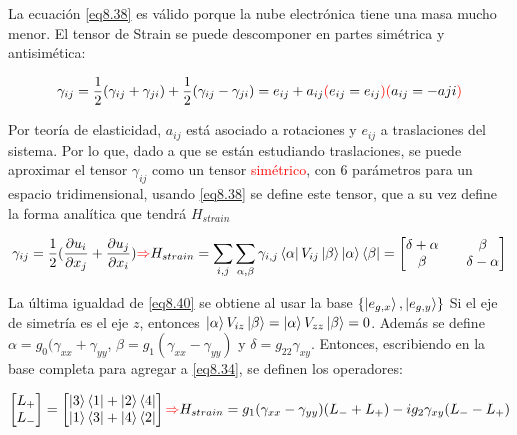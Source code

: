 \documentclass{book}
\begin{document}
La ecuación \ref{eq8.38} es válido porque la nube electrónica tiene una masa mucho menor. El tensor de Strain se puede descomponer en partes simétrica y antisimética:

\begin{equation}\label{eq8.39}\gamma_{ij}=\frac{1}{2}( \gamma_{ij}+\gamma_{ji})+\frac{1}{2}(\gamma_{ij}-\gamma_{ji})=e_{ij}+a_{ij} \textcolor{red}{(}e_{ij}=e_{ij}\textcolor{red}{)}\textcolor{red}{(}a_{ij}=-a{ji}\textcolor{red}{)}\end{equation}

Por teoría de elasticidad, $a_{ij}$ está asociado a rotaciones y $e_{ij}$ a traslaciones del sistema. Por lo que, dado a que se están estudiando traslaciones, se puede aproximar el tensor $\gamma_{ij}$ como un tensor \textcolor{red}{simétrico}, con $6$ parámetros para un espacio tridimensional, usando \ref{eq8.38} se define este tensor, que a su vez define la forma analítica que tendrá $H_{strain}$

\begin{equation}\label{eq8.40}\gamma_{ij}=\frac{1}{2}(\frac{\partial u_i}{\partial x_j}+\frac{\partial u_j}{\partial x_i})\textcolor{red}{\Rightarrow} H_{strain}=\sum_{i,j}\sum_{\alpha,\beta}\gamma_{i,j}\bra{\alpha}V_{ij}\ket{\beta} \ket{\alpha}\bra{\beta}=\begin{bmatrix} \delta+\alpha && \beta \\ \beta && \delta-\alpha\end{bmatrix}\end{equation}

La última igualdad de \ref{eq8.40} se obtiene al usar la base $\{\ket{e_{g,x}},\ket{e_{g,y}}\}$ Si el eje de simetría es el eje $z$, entonces $\ket{\alpha}V_{iz}\ket{\beta}=\ket{\alpha}V_{zz}\ket{\beta}=0$. Además se define $\alpha=g_0(\gamma_{xx}+\gamma_{yy}$, $\beta=g_1(\gamma_{xx}-\gamma_{yy})$ y $\delta=g_{22}\gamma_{xy}$. Entonces, escribiendo en la base completa para agregar a \ref{eq8.34}, se definen los operadores:

\begin{equation}\label{eq8.41}\begin{bmatrix}L_+\\L_-\end{bmatrix}=\begin{bmatrix}\ket{3}\bra{1}+\ket{2}\bra{4}\\\ket{1}\bra{3}+\ket{4}\bra{2}\end{bmatrix}\textcolor{red}{\Rightarrow} H_{strain}=g_1(\gamma_{xx}-\gamma_{yy})(L_-+L_+)-ig_2\gamma_{xy}(L_--L_+)\end{equation}
\end{document}
